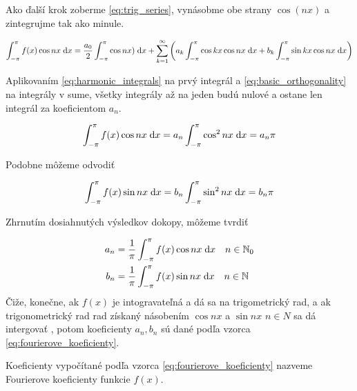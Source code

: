Ako ďalší krok zoberme \ref{eq:trig_series}, vynásobme obe strany
$\cos(nx)$ a zintegrujme tak ako minule.

\begin{equation}
    \int_{-\pi}^{\pi} f(x) \cos nx  \; \mathrm{d} x = \frac{a_0}{2} \int_{-\pi}^{\pi} \cos nx) \; \mathrm{d} x +
        \sum_{k=1}^{\infty} \left(
            a_k \int_{-\pi}^{\pi} \cos kx \cos nx \; \mathrm{d} x +
            b_k \int_{-\pi}^{\pi} \sin kx \cos nx \; \mathrm{d} x
        \right)
\end{equation}

Aplikovaním \ref{eq:harmonic_integrals} na prvý integrál a 
\ref{eq:basic_orthogonality} na integrály v sume, všetky integrály
až na jeden budú nulové a ostane len integrál za koeficientom $a_n$.

\begin{equation}
    \int_{-\pi}^{\pi} f(x) \cos nx \; \mathrm{d} x = a_n \int_{-\pi}^{\pi} \cos^2 nx \; \mathrm{d} x = a_n \pi
\end{equation}

Podobne môžeme odvodiť

\begin{equation}
    \int_{-\pi}^{\pi} f(x) \sin nx \; \mathrm{d} x = b_n \int_{-\pi}^{\pi} \sin^2 nx \; \mathrm{d} x = b_n \pi
\end{equation}

Zhrnutím dosiahnutých výsledkov dokopy, môžeme tvrdiť

\begin{align}
    a_n &=  \frac{1}{\pi} \int_{-\pi}^{\pi} f(x) \cos n x \; \mathrm{d} x \quad n\in \mathbb{N}_0
     \nonumber \\
    b_n &=  \frac{1}{\pi} \int_{-\pi}^{\pi} f(x) \sin n x \; \mathrm{d} x \quad n\in \mathbb{N}
    \label{eq:furierove_koeficienty}
\end{align}
Čiže, konečne, ak $f(x)$ je intogravateľná a dá sa  na
trigometrický rad, a ak trigonometrický rad rad získaný násobením
$\cos nx$ a $\sin nx$ $n\in N$ sa dá intergovať ,
potom koeficienty $a_n, b_n$ sú dané podľa vzorca
\ref{eq:fourierove_koeficienty}.

\begin{definicia}
    Koeficienty vypočítané podľa vzorca
    \ref{eq:fourierove_koeficienty} nazveme Fourierove koeficienty
    funkcie $f(x)$.
\end{definicia}


